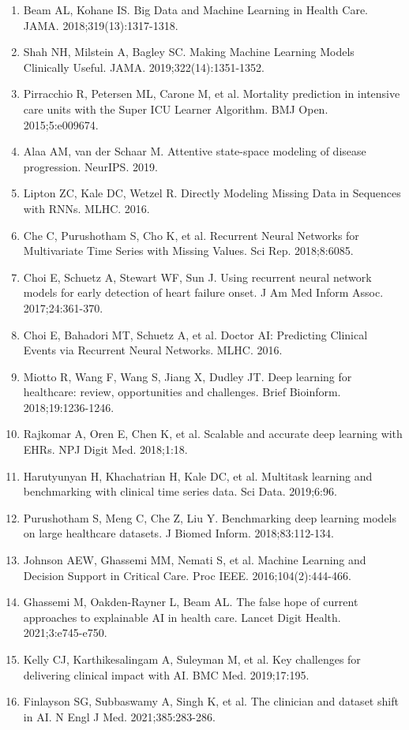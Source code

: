 \documentclass[11pt]{article}
\begin{document}
\begin{enumerate}
\item Beam AL, Kohane IS. Big Data and Machine Learning in Health Care. JAMA. 2018;319(13):1317-1318.
\item Shah NH, Milstein A, Bagley SC. Making Machine Learning Models Clinically Useful. JAMA. 2019;322(14):1351-1352.
\item Pirracchio R, Petersen ML, Carone M, et al. Mortality prediction in intensive care units with the Super ICU Learner Algorithm. BMJ Open. 2015;5:e009674.
\item Alaa AM, van der Schaar M. Attentive state-space modeling of disease progression. NeurIPS. 2019.
\item Lipton ZC, Kale DC, Wetzel R. Directly Modeling Missing Data in Sequences with RNNs. MLHC. 2016.
\item Che C, Purushotham S, Cho K, et al. Recurrent Neural Networks for Multivariate Time Series with Missing Values. Sci Rep. 2018;8:6085.
\item Choi E, Schuetz A, Stewart WF, Sun J. Using recurrent neural network models for early detection of heart failure onset. J Am Med Inform Assoc. 2017;24:361-370.
\item Choi E, Bahadori MT, Schuetz A, et al. Doctor AI: Predicting Clinical Events via Recurrent Neural Networks. MLHC. 2016.
\item Miotto R, Wang F, Wang S, Jiang X, Dudley JT. Deep learning for healthcare: review, opportunities and challenges. Brief Bioinform. 2018;19:1236-1246.
\item Rajkomar A, Oren E, Chen K, et al. Scalable and accurate deep learning with EHRs. NPJ Digit Med. 2018;1:18.
\item Harutyunyan H, Khachatrian H, Kale DC, et al. Multitask learning and benchmarking with clinical time series data. Sci Data. 2019;6:96.
\item Purushotham S, Meng C, Che Z, Liu Y. Benchmarking deep learning models on large healthcare datasets. J Biomed Inform. 2018;83:112-134.
\item Johnson AEW, Ghassemi MM, Nemati S, et al. Machine Learning and Decision Support in Critical Care. Proc IEEE. 2016;104(2):444-466.
\item Ghassemi M, Oakden-Rayner L, Beam AL. The false hope of current approaches to explainable AI in health care. Lancet Digit Health. 2021;3:e745-e750.
\item Kelly CJ, Karthikesalingam A, Suleyman M, et al. Key challenges for delivering clinical impact with AI. BMC Med. 2019;17:195.
\item Finlayson SG, Subbaswamy A, Singh K, et al. The clinician and dataset shift in AI. N Engl J Med. 2021;385:283-286.

\end{enumerate}
\end{document}
